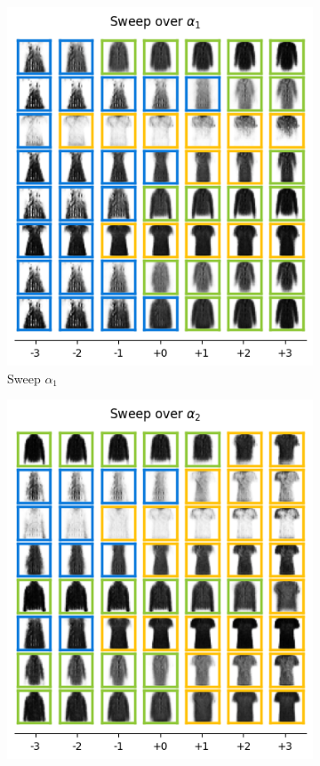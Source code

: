 \begin{figure}[h]
    \centering
    \begin{subfigure}[t]{.25\linewidth}
        \includegraphics[width=.9\textwidth]{openreview/pictures/fmnist/alpha_1.png}
        \caption{Sweep $\alpha_1$}
        \label{fig:alpha_1}
    \end{subfigure}
     \begin{subfigure}[t]{.25\linewidth}
        \includegraphics[width=.9\textwidth]{openreview/pictures/fmnist/alpha_2.png}

\end{subfigure}
\end{figure}
